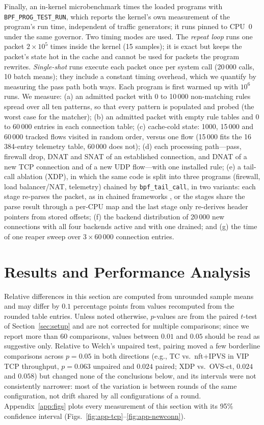 \documentclass[conference]{IEEEtran}
\begin{document}
Finally, an in-kernel microbenchmark times the loaded programs with
\texttt{BPF\_PROG\_TEST\_RUN}, which reports the kernel's own measurement of
the program's run time, independent of traffic generators; it runs pinned to
CPU~0 under the same governor. Two timing modes are used. The \emph{repeat
loop} runs one packet $2\times10^5$ times inside the kernel (15 samples); it
is exact but keeps the packet's state hot in the cache and cannot be used for
packets the program rewrites. \emph{Single-shot} runs execute each packet once
per system call (20\,000 calls, 10 batch means); they include a constant
timing overhead, which we quantify by measuring the pass path both ways. Each
program is first warmed up with $10^6$ runs. We
measure: (a) an admitted packet with 0 to 10\,000 non-matching rules spread
over all ten patterns, so that every pattern is populated and probed (the
worst case for the matcher); (b) an admitted packet with empty rule tables
and 0 to 60\,000 entries in each connection table; (c) cache-cold state: 1000, 15\,000 and 60\,000 tracked
flows visited in random order, versus one flow (15\,000 fits the
16\,384-entry telemetry table, 60\,000 does not); (d) each processing
path---pass, firewall drop, DNAT and SNAT of an established connection, and
DNAT of a new TCP connection and of a new UDP flow---with one installed rule;
(e) a tail-call ablation (XDP), in which the same code is split into three
programs (firewall, load balancer/NAT, telemetry) chained by
\texttt{bpf\_tail\_call}, in two variants: each stage re-parses the packet,
as in chained frameworks \cite{miano2021polycube}, or the stages share the
parse result through a per-CPU map and the last stage only re-derives header
pointers from stored offsets; (f) the
backend distribution of 20\,000 new connections with all four backends
active and with one drained; and (g) the time of one reaper sweep over
$3\times60\,000$ connection entries.

\section{Results and Performance Analysis}
\label{sec:results}
Relative differences in this section are computed from unrounded sample
means and may differ by $0.1$ percentage points from values recomputed from
the rounded table entries. Unless noted otherwise, $p$-values are from the
paired $t$-test of Section~\ref{sec:setup} and are not corrected for
multiple comparisons; since we report more than 60 comparisons, values
between $0.01$ and $0.05$ should be read as suggestive only. Relative to
Welch's unpaired test, pairing moved a few borderline comparisons across
$p=0.05$ in both directions (e.g., TC vs.\ nft+IPVS in VIP TCP throughput,
$p=0.063$ unpaired and $0.024$ paired; XDP vs.\ OVS-ct, $0.024$ and $0.058$)
but changed none of the conclusions below, and its intervals were not
consistently narrower: most of the variation is between rounds of the same
configuration, not drift shared by all configurations of a round.
Appendix~\ref{app:figs} plots every measurement of this section with its
95\% confidence interval (Figs.~\ref{fig:app-tcp}--\ref{fig:app-newconn}).
\end{document}
